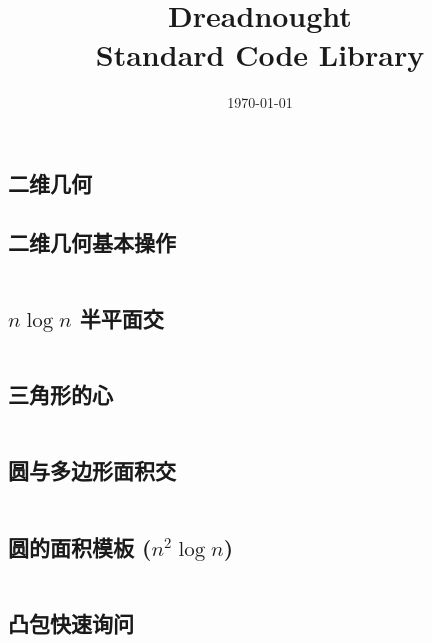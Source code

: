 \documentclass[titlepage,landscape,a4paper,10pt]{article}
\title{\LARGE{Dreadnought} \\[2ex] \Large{Standard Code Library} }
\date{\today}
\begin{document}
\maketitle

\begin{multicols*}{2}

\begin{spacing}{0}
	\tableofcontents
\end{spacing}
\end{multicols*}

\begin{multicols}{2}

\newpage
\begin{spacing}{0.8}

\section{二维几何}

\subsection{二维几何基本操作}
\inputminted{cpp}{merge/Geo2D.cpp}

\subsection{$n\log n$ 半平面交}
\inputminted{cpp}{merge/HalfPlaneIntersection.cpp}

\subsection{三角形的心}
\inputminted{cpp}{improve/Triangle.cpp}

\subsection{圆与多边形面积交}
\inputminted{cpp}{merge/areaCT.cpp}

\subsection{圆的面积模板 ($n^2\log n$)}
\inputminted{cpp}{merge/CircleArea.cpp}

\subsection{凸包快速询问}
\inputminted{cpp}{improve/PlayWithConvex.cpp}


\end{spacing}
\end{multicols}
\end{document}
